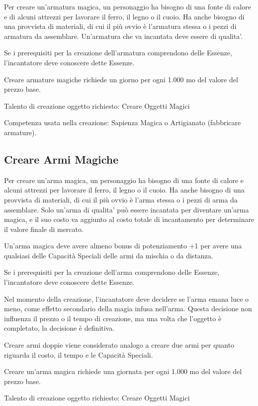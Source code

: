 \documentclass[a4paper,11pt,twoside,openany]{book}
\begin{document}
Per creare un'armatura magica, un personaggio ha bisogno di una fonte di calore e di alcuni attrezzi per lavorare il ferro, il legno o il cuoio. Ha anche bisogno di una provvista di materiali, di cui il più ovvio è l'armatura stessa o i pezzi di armatura da assemblare. Un'armatura che va incantata deve essere di qualita'.

Se i prerequisiti per la creazione dell'armatura comprendono delle Essenze, l'incantatore deve conoscere dette Essenze.

Creare armature magiche richiede un giorno per ogni 1.000 mo del valore
del prezzo base.

Talento di creazione oggetto richiesto: Creare Oggetti Magici

Competenza usata nella creazione: Sapienza Magica o Artigianato (fabbricare armature).

\subsection{Creare Armi Magiche}

Per creare un'arma magica, un personaggio ha bisogno di una fonte di calore e alcuni attrezzi per lavorare il ferro, il legno o il cuoio. Ha anche bisogno di una provvista di materiali, di cui il più ovvio è l'arma stessa o i pezzi di arma da assemblare. Solo un'arma di qualita' può essere incantata per diventare un'arma magica, e il suo costo va aggiunto al costo totale di incantamento per determinare il valore finale di mercato.

Un'arma magica deve avere almeno bonus di potenziamento +1 per avere una qualsiasi delle Capacità Speciali delle armi da mischia o da distanza.

Se i prerequisiti per la creazione dell'arma comprendono delle Essenze, l'incantatore deve conoscere dette Essenze.

Nel momento della creazione, l'incantatore deve decidere se l'arma emana luce o meno, come effetto secondario della magia infusa nell'arma. Questa decisione non influenza il prezzo o il tempo di creazione, ma una volta che l'oggetto è completato, la decisione è definitiva.

Creare armi doppie viene considerato analogo a creare due armi per quanto riguarda il costo, il tempo e le Capacità Speciali.

Creare un'arma magica richiede una giornata per ogni 1.000 mo del valore del prezzo base.

Talento di creazione oggetto richiesto: Creare Oggetti Magici
\end{document}
